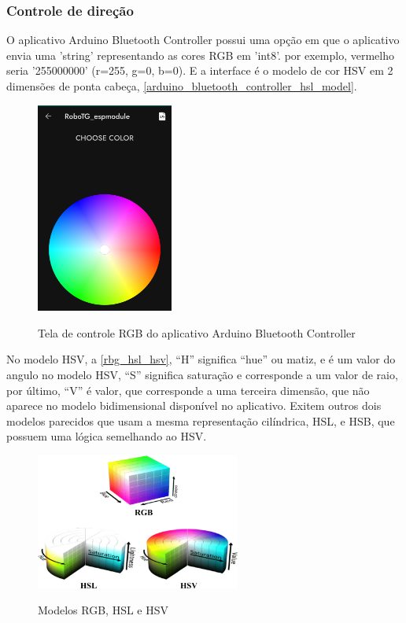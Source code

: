 \subsubsection{Controle de direção}

O aplicativo Arduino Bluetooth Controller possui uma opção em que o aplicativo envia uma
'string' representando as cores RGB em 'int8'.
por exemplo,  vermelho seria '255000000' (r=255, g=0, b=0).
E a interface é o modelo de cor HSV em 2 dimensões de ponta cabeça,
\autoref{arduino_bluetooth_controller_hsl_model}.


\begin{figure}[ht]
	\centering
	\caption{Tela de controle RGB do aplicativo Arduino Bluetooth Controller}
	\includegraphics[width=0.40\textwidth]{figures/andriod_bluetooth_controller_hsl_model}
	\label{arduino_bluetooth_controller_hsl_model}
\end{figure}

No modelo HSV,  a \autoref{rbg_hsl_hsv}, ``H'' significa ``hue'' ou matiz, e é 
um valor do angulo no modelo HSV, ``S'' significa saturação e corresponde a um valor de raio,
por último, ``V'' é valor, que corresponde a uma terceira dimensão, 
que não aparece no modelo bidimensional disponível no aplicativo.
Exitem outros dois modelos parecidos que usam a mesma representação cilíndrica, 
HSL, e HSB, que possuem uma lógica semelhando ao HSV.


\begin{figure}[ht]
	\centering
	\caption{Modelos RGB, HSL e HSV}
	\includegraphics[width=0.6\textwidth]{figures/RBG_HSL_HSV}
	\label{rbg_hsl_hsv}
\end{figure}

